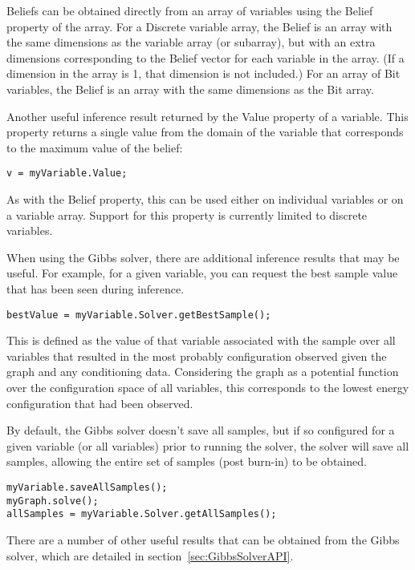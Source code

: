 Beliefs can be obtained directly from an array of variables using the Belief property of the array.  For a Discrete variable array, the Belief is an array with the same dimensions as the variable array (or subarray), but with an extra dimensions corresponding to the Belief vector for each variable in the array.  (If a dimension in the array is 1, that dimension is not included.)  For an array of Bit variables, the Belief is an array with the same dimensions as the Bit array.

Another useful inference result returned by the Value property of a variable.  This property returns a single value from the domain of the variable that corresponds to the maximum value of the belief:

\begin{lstlisting}
v = myVariable.Value;
\end{lstlisting}

As with the Belief property, this can be used either on individual variables or on a variable array.  Support for this property is currently limited to discrete variables.

When using the Gibbs solver, there are additional inference results that may be useful.  For example, for a given variable, you can request the best sample value that has been seen during inference.

\begin{lstlisting}
bestValue = myVariable.Solver.getBestSample();
\end{lstlisting}

This is defined as the value of that variable associated with the sample over all variables that resulted in the most probably configuration observed given the graph and any conditioning data. Considering the graph as a potential function over the configuration space of all variables, this corresponds to the lowest energy configuration that had been observed.

By default, the Gibbs solver doesn't save all samples, but if so configured for a given variable (or all variables) prior to running the solver, the solver will save all samples, allowing the entire set of samples (post burn-in) to be obtained.

\begin{lstlisting}
myVariable.saveAllSamples();
myGraph.solve();
allSamples = myVariable.Solver.getAllSamples();
\end{lstlisting}

There are a number of other useful results that can be obtained from the Gibbs solver, which are detailed in section~\ref{sec:GibbsSolverAPI}.


